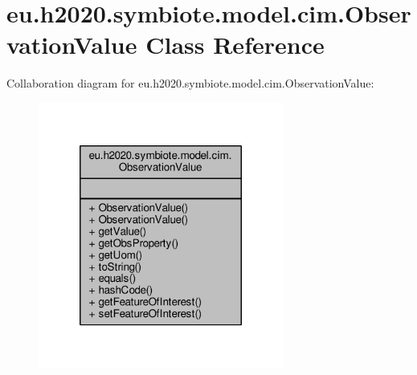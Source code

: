 \hypertarget{classeu_1_1h2020_1_1symbiote_1_1model_1_1cim_1_1ObservationValue}{}\section{eu.\+h2020.\+symbiote.\+model.\+cim.\+Observation\+Value Class Reference}
\label{classeu_1_1h2020_1_1symbiote_1_1model_1_1cim_1_1ObservationValue}


Collaboration diagram for eu.\+h2020.\+symbiote.\+model.\+cim.\+Observation\+Value\+:
\nopagebreak
\begin{figure}[H]
\begin{center}
\leavevmode
\includegraphics[width=228pt]{classeu_1_1h2020_1_1symbiote_1_1model_1_1cim_1_1ObservationValue__coll__graph}
\end{center}
\end{figure}
